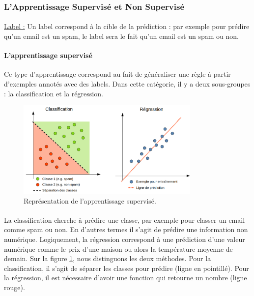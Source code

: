 \documentclass[10pt, french, a4paper]{report}
\begin{document}
\subsubsection{L'Apprentissage Supervisé et Non Supervisé}

\paragraph{}
\underline{Label :} Un label correspond à la cible de la prédiction : par exemple pour prédire qu'un email est un spam, le label sera le fait qu'un email est un spam ou non.

\paragraph{L'apprentissage supervisé}
Ce type d'apprentissage correspond au fait de généraliser une règle à partir d'exemples annotés avec des labels. Dans cette catégorie, il y a deux sous-groupes : la classification et la régression.

\begin{figure}[H]
  \centering
  \includegraphics[width=0.8\textwidth]{images/apprentissage_supervise.png}
  \caption{Représentation de l'apprentissage supervisé.}
  \label{fig:apprentissage_supervise}
\end{figure}

\paragraph{}
La classification cherche à prédire une classe, par exemple pour classer un email comme spam ou non. En d'autres termes il s'agit de prédire une information non numérique. Logiquement, la régression correspond à une prédiction d'une valeur numérique comme le prix d'une maison ou alors la température moyenne de demain. Sur la figure \ref{fig:apprentissage_supervise}, nous distinguons les deux méthodes. Pour la classification, il s'agit de séparer les classes pour prédire (ligne en pointillé). Pour la régression, il est nécessaire d'avoir une fonction qui retourne un nombre (ligne rouge).
\end{document}
